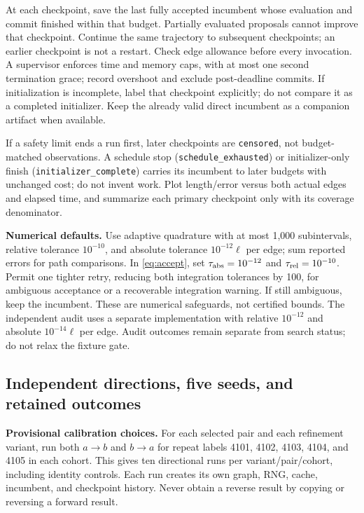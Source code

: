 \documentclass[11pt,letterpaper]{article}
\newcommand{\src}[1]{\nolinkurl{#1}}
\begin{document}
At each checkpoint, save the last fully accepted incumbent whose evaluation and commit finished within that budget. Partially evaluated proposals cannot improve that checkpoint. Continue the same trajectory to subsequent checkpoints; an earlier checkpoint is not a restart. Check edge allowance before every invocation. A supervisor enforces time and memory caps, with at most one second termination grace; record overshoot and exclude post-deadline commits. If initialization is incomplete, label that checkpoint explicitly; do not compare it as a completed initializer. Keep the already valid direct incumbent as a companion artifact when available.

If a safety limit ends a run first, later checkpoints are \src{censored}, not budget-matched observations. A schedule stop (\src{schedule_exhausted}) or initializer-only finish (\src{initializer_complete}) carries its incumbent to later budgets with unchanged cost; do not invent work. Plot length/error versus both actual edges and elapsed time, and summarize each primary checkpoint only with its coverage denominator.

\textbf{Numerical defaults.} Use adaptive quadrature with at most 1,000 subintervals, relative tolerance $10^{-10}$, and absolute tolerance $10^{-12}\ell$ per edge; sum reported errors for path comparisons. In \eqref{eq:accept}, set $\tau_{\rm abs}=10^{-12}$ and $\tau_{\rm rel}=10^{-10}$. Permit one tighter retry, reducing both integration tolerances by 100, for ambiguous acceptance or a recoverable integration warning. If still ambiguous, keep the incumbent. These are numerical safeguards, not certified bounds. The independent audit uses a separate implementation with relative $10^{-12}$ and absolute $10^{-14}\ell$ per edge. Audit outcomes remain separate from search status; do not relax the fixture gate.

\subsection{Independent directions, five seeds, and retained outcomes}
\textbf{Provisional calibration choices.} For each selected pair and each refinement variant, run both $a\to b$ and $b\to a$ for repeat labels 4101, 4102, 4103, 4104, and 4105 in each cohort. This gives ten directional runs per variant/pair/cohort, including identity controls. Each run creates its own graph, RNG, cache, incumbent, and checkpoint history. Never obtain a reverse result by copying or reversing a forward result.
\end{document}
